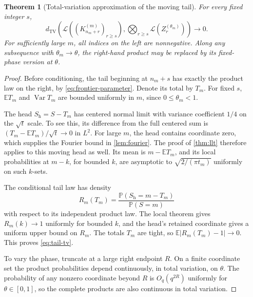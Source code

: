 \documentclass[11pt,a4paper]{article}
\numberwithin{equation}{section}
\newtheorem{theorem}{Theorem}[section]
\theoremstyle{definition}
\theoremstyle{remark}
\newcommand{\E}{\mathbb E}
\newcommand{\PP}{\mathbb P}
\newcommand{\Var}{\operatorname{Var}}
\newcommand{\Law}{\mathcal L}
\newcommand{\TV}{d_{\mathrm{TV}}}
\begin{document}
\begin{theorem}[Total-variation approximation of the moving tail]
\label{thm:tail-tv}
For every fixed integer $s$,
\begin{equation}
\TV\left(
 \Law((K_{n_m+r}^{(m)})_{r\ge s}),
 \bigotimes_{r\ge s}\Law(Z_r^{(\theta_m)})
\right)\longrightarrow0.
\label{eq:tail-tv}
\end{equation}
For sufficiently large $m$, all indices on the left are nonnegative.
Along any subsequence with $\theta_m\to\theta$, the right-hand product
may be replaced by its fixed-phase version at $\theta$.
\end{theorem}
\begin{proof}
Before conditioning, the tail beginning at $n_m+s$ has exactly the
product law on the right, by \cref{eq:frontier-parameter}. Denote its
total by $T_m$. For fixed $s$, $\E T_m$ and $\Var T_m$ are bounded
uniformly in $m$, since $0\le\theta_m<1$.

The head $S_{\mathrm h}=S-T_m$ has centered normal limit with variance
coefficient $1/4$ on the $\sqrt t$ scale. To see this, its difference from
the full centered sum is $(T_m-\E T_m)/\sqrt t\to0$ in $L^2$.
For large $m$, the head contains coordinate zero, which supplies the
Fourier bound in \cref{lem:fourier}. The proof of \cref{thm:llt}
therefore applies to this moving head as well. Its mean is
$m-\E T_m$, and its local probabilities at $m-k$, for bounded $k$,
are asymptotic to $\sqrt{2/(\pi t_m)}$ uniformly on such $k$-sets.

The conditional tail law has density
\[
R_m(T_m)=\frac{\PP(S_{\mathrm h}=m-T_m)}{\PP(S=m)}
\]
with respect to its independent product law. The local theorem gives
$R_m(k)\to1$ uniformly for bounded $k$, and the head's retained
coordinate gives a uniform upper bound on $R_m$. The totals $T_m$ are
tight, so $\E|R_m(T_m)-1|\to0$. This proves \cref{eq:tail-tv}.

To vary the phase, truncate at a large right endpoint $R$. On a finite
coordinate set the product probabilities depend continuously, in total
variation, on $\theta$. The probability of any nonzero coordinate beyond
$R$ is $O_q(q^{2R})$ uniformly for $\theta\in[0,1]$, so the complete products are
also continuous in total variation.
\end{proof}
\end{document}
